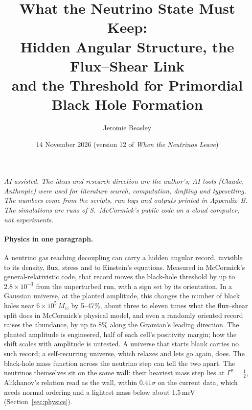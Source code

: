 \documentclass[11pt]{article}
\title{What the Neutrino State Must Keep:\\ Hidden Angular Structure, the Flux--Shear Link\\ and the Threshold for Primordial Black Hole Formation}
\author{Jeromie Beasley}
\date{14 November 2026 \quad (version 12 of \emph{When the Neutrinos Leave})}
\begin{document}
\maketitle

\noindent\emph{AI-assisted. The ideas and research direction are the author's; AI tools (Claude, Anthropic) were used for literature search, computation, drafting and typesetting. The numbers come from the scripts, run logs and outputs printed in Appendix~B. The simulations are runs of S.~McCormick's public code on a cloud computer, not experiments.}

\paragraph{Physics in one paragraph.} A neutrino gas reaching decoupling can carry a hidden angular record, invisible to its density, flux, stress and to Einstein's equations. Measured in McCormick's general-relativistic code, that record moves the black-hole threshold by up to $2.8\times10^{-3}$ from the unperturbed run, with a sign set by its orientation. In a Gaussian universe, at the planted amplitude, this changes the number of black holes near $6\times10^5\,M_\odot$ by 5--47\%, about three to eleven times what the flux--shear split does in McCormick's physical model, and even a randomly oriented record raises the abundance, by up to 8\% along the Gramian's leading direction. The planted amplitude is engineered, half of each cell's positivity margin; how the shift scales with amplitude is untested. A universe that starts blank carries no such record; a self-recurring universe, which relaxes and lets go again, does. The black-hole mass function across the neutrino step can tell the two apart. The neutrinos themselves sit on the same wall: their heaviest mass step lies at $\Gamma^2=\tfrac12$, Alikhanov's relation read as the wall, within $0.41\sigma$ on the current data, which needs normal ordering and a lightest mass below about 1.5\,meV (Section~\ref{sec:physics}).
\end{document}
